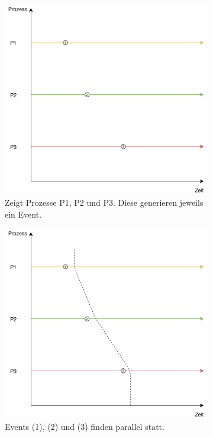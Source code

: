 \begin{figure}[!ht]
	\centering
	\begin{subfigure}[t]{.49\linewidth}
		\centering\includegraphics[width=.8\linewidth]{img/Themenueberblick/PartialOrdering_Concurrent.png}
		\caption[Abbildung]{Zeigt Prozesse P1, P2 und P3. Diese generieren jeweils ein Event.}
		\label{fig:Partial_Ordering_Concurrent_explained_1}
	\end{subfigure}
	\begin{subfigure}[t]{.49\linewidth}
		\centering\includegraphics[width=.8\linewidth]{img/Themenueberblick/PartialOrdering_Concurrent_Explained}
		\caption[Abbildung]{Events (1), (2) und (3) finden parallel statt.}
		\label{fig:Partial_Ordering_Concurrent_explained_2}
	\end{subfigure}
\caption[Partielle Ordnung der Events dreier Prozesse]{}
\end{figure} 


